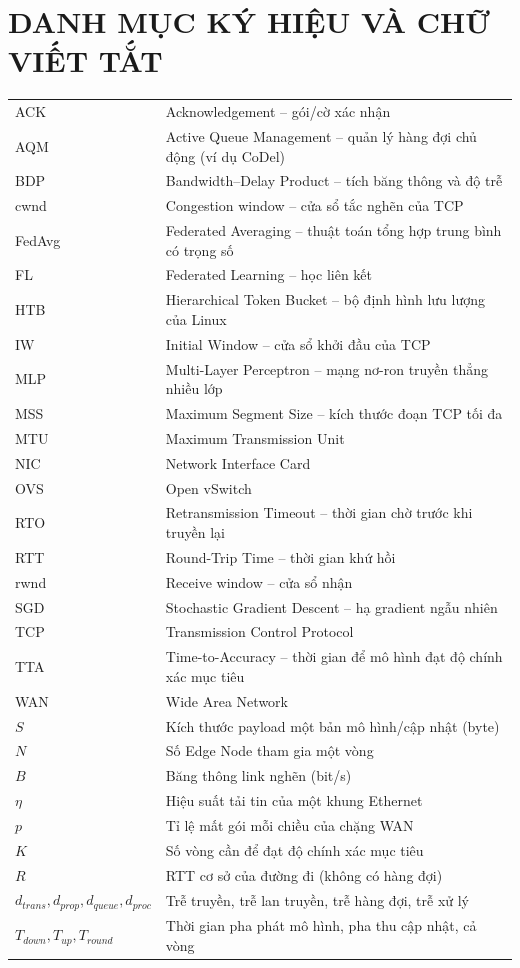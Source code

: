 \section*{\centering DANH MỤC KÝ HIỆU VÀ CHỮ VIẾT TẮT}
\begin{longtable}{ @{} p{4.6cm} p{9.9cm} @{} }
ACK & Acknowledgement -- gói/cờ xác nhận \\
AQM & Active Queue Management -- quản lý hàng đợi chủ động (ví dụ CoDel) \\
BDP & Bandwidth--Delay Product -- tích băng thông và độ trễ \\
cwnd & Congestion window -- cửa sổ tắc nghẽn của TCP \\
FedAvg & Federated Averaging -- thuật toán tổng hợp trung bình có trọng số \\
FL & Federated Learning -- học liên kết \\
HTB & Hierarchical Token Bucket -- bộ định hình lưu lượng của Linux \\
IW & Initial Window -- cửa sổ khởi đầu của TCP \\
MLP & Multi-Layer Perceptron -- mạng nơ-ron truyền thẳng nhiều lớp \\
MSS & Maximum Segment Size -- kích thước đoạn TCP tối đa \\
MTU & Maximum Transmission Unit \\
NIC & Network Interface Card \\
OVS & Open vSwitch \\
RTO & Retransmission Timeout -- thời gian chờ trước khi truyền lại \\
RTT & Round-Trip Time -- thời gian khứ hồi \\
rwnd & Receive window -- cửa sổ nhận \\
SGD & Stochastic Gradient Descent -- hạ gradient ngẫu nhiên \\
TCP & Transmission Control Protocol \\
TTA & Time-to-Accuracy -- thời gian để mô hình đạt độ chính xác mục tiêu \\
WAN & Wide Area Network \\[2ex]
$S$ & Kích thước payload một bản mô hình/cập nhật (byte) \\
$N$ & Số Edge Node tham gia một vòng \\
$B$ & Băng thông link nghẽn (bit/s) \\
$\eta$ & Hiệu suất tải tin của một khung Ethernet \\
$p$ & Tỉ lệ mất gói mỗi chiều của chặng WAN \\
$K$ & Số vòng cần để đạt độ chính xác mục tiêu \\
$R$ & RTT cơ sở của đường đi (không có hàng đợi) \\
$d_{trans}, d_{prop}, d_{queue}, d_{proc}$ & Trễ truyền, trễ lan truyền, trễ hàng đợi, trễ xử lý \\
$T_{down}, T_{up}, T_{round}$ & Thời gian pha phát mô hình, pha thu cập nhật, cả vòng \\
\end{longtable}
\cleardoublepage
